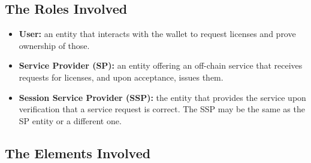 \subsection{The Roles Involved} 

\begin{itemize}
    \item \textbf{User:} an entity that interacts with the wallet to request licenses and prove ownership of those.
    \item \textbf{Service Provider (SP):} an entity offering an off-chain service that receives requests for licenses, and upon acceptance, issues them.
    \item \textbf{Session Service Provider (SSP):} the entity that provides the service upon verification that a service request is correct. The SSP may be the same as the SP entity or a different one.
\end{itemize}

\subsection{The Elements Involved} 

